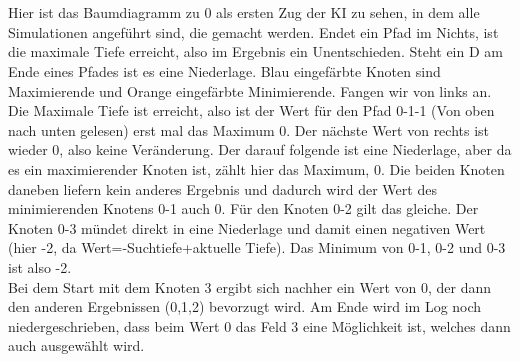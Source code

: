 \documentclass[12pt,a4paper]{article}
\begin{document}
	\\\\
	Hier ist das Baumdiagramm zu 0 als ersten Zug der KI zu sehen, in dem alle Simulationen angeführt sind, die gemacht werden. Endet ein Pfad im Nichts, ist die maximale Tiefe erreicht, also im Ergebnis ein Unentschieden. Steht ein D am Ende eines Pfades ist es eine Niederlage. Blau eingefärbte Knoten sind Maximierende und Orange eingefärbte Minimierende. Fangen wir von links an.\\ Die Maximale Tiefe ist erreicht, also ist der Wert für den Pfad 0-1-1 (Von oben nach unten gelesen) erst mal das Maximum 0. Der nächste Wert von rechts ist wieder 0, also keine Veränderung. Der darauf folgende ist eine Niederlage, aber da es ein maximierender Knoten ist, zählt hier das Maximum, 0. Die beiden Knoten daneben liefern kein anderes Ergebnis und dadurch wird der Wert des minimierenden Knotens 0-1 auch 0. Für den Knoten 0-2 gilt das gleiche. Der Knoten 0-3 mündet direkt in eine Niederlage und damit einen negativen Wert (hier -2, da Wert=-Suchtiefe+aktuelle Tiefe). Das Minimum von 0-1, 0-2 und 0-3 ist also -2.\\
	Bei dem Start mit dem Knoten 3 ergibt sich nachher ein Wert von 0, der dann den anderen Ergebnissen (0,1,2) bevorzugt wird. Am Ende wird im Log noch niedergeschrieben, dass beim Wert 0 das Feld 3 eine Möglichkeit ist, welches dann auch ausgewählt wird.
\end{document}
